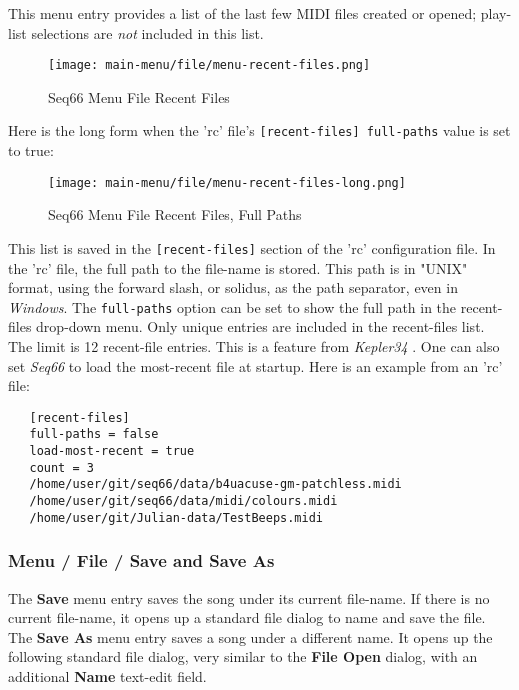    This menu entry provides a list of the last few MIDI files created or opened;
   play-list selections are \textsl{not} included in this list.

\begin{figure}[H]
   \centering 
   \texttt{[image: main-menu/file/menu-recent-files.png]}
   \caption{Seq66 Menu File Recent Files}
   \label{fig:menu_file_recent_files}
\end{figure}

   Here is the long form when the 'rc' file's
   \texttt{[recent-files] full-paths} value is set to true:

\begin{figure}[H]
   \centering 
   \texttt{[image: main-menu/file/menu-recent-files-long.png]}
   \caption{Seq66 Menu File Recent Files, Full Paths}
   \label{fig:menu_file_recent_files_full_paths}
\end{figure}

   This list is saved in the \texttt{[recent-files]} section of the
   'rc' configuration file.
   In the 'rc' file, the full path to the file-name is stored.
   This path is in "UNIX" format, using the forward slash, or solidus,
   as the path separator, even in \textsl{Windows}.
   The \texttt{full-paths} option can be set to show the full path in the
   recent-files drop-down menu.
   Only unique entries are included in the recent-files list.
   The limit is 12 recent-file entries.
   This is a feature from \textsl{Kepler34} \cite{kepler34}.
   One can also set \textsl{Seq66} to load the most-recent file at startup.
   Here is an example from an 'rc' file:

\begin{verbatim}
   [recent-files]
   full-paths = false
   load-most-recent = true
   count = 3
   /home/user/git/seq66/data/b4uacuse-gm-patchless.midi
   /home/user/git/seq66/data/midi/colours.midi
   /home/user/git/Julian-data/TestBeeps.midi
\end{verbatim}

\subsubsection{Menu / File / Save and Save As}
\label{subsubsec:menu_file_open_save_as}

   The \textbf{Save} menu entry saves the song under its current file-name.
   If there is no current file-name, it opens up a standard file
   dialog to name and save the file.
   The \textbf{Save As} menu entry saves a song under a different name.
   It opens up the following standard file dialog, very similar to the 
   \textbf{File Open} dialog, with an additional \textbf{Name} text-edit field.

